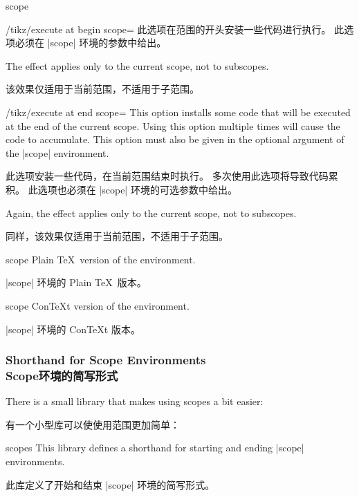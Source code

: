 \begin{environment}{{scope}}
\begin{key}{/tikz/execute at begin scope=}
      此选项在范围的开头安装一些代码进行执行。
      此选项必须在 |{scope}| 环境的参数中给出。
  

      The effect applies only to the current scope, not to subscopes.

      该效果仅适用于当前范围，不适用于子范围。

  \end{key}

  \begin{key}{/tikz/execute at end scope=}
      This option installs some code that will be executed at the end of the
      current scope. Using this option multiple times will cause the code to
      accumulate. This option must also be given in the optional argument of
      the |{scope}| environment.

      此选项安装一些代码，在当前范围结束时执行。
  多次使用此选项将导致代码累积。
  此选项也必须在 |{scope}| 环境的可选参数中给出。

      Again, the effect applies only to the current scope, not to subscopes.

      同样，该效果仅适用于当前范围，不适用于子范围。

  \end{key}
\end{environment}

\begin{plainenvironment}{{scope}}
  Plain \TeX\ version of the environment.

  |{scope}| 环境的 Plain \TeX\ 版本。
\end{plainenvironment}

\begin{contextenvironment}{{scope}}
  Con\TeX t version of the environment.

  |{scope}| 环境的 Con\TeX t 版本。
\end{contextenvironment}


\subsubsection{Shorthand for Scope Environments\\Scope环境的简写形式}

There is a small library that makes using scopes a bit easier:

有一个小型库可以使使用范围更加简单：
%
\begin{tikzlibrary}{scopes}
  This library defines a shorthand for starting and ending |{scope}|
  environments.

  此库定义了开始和结束 |{scope}| 环境的简写形式。

\end{tikzlibrary}


